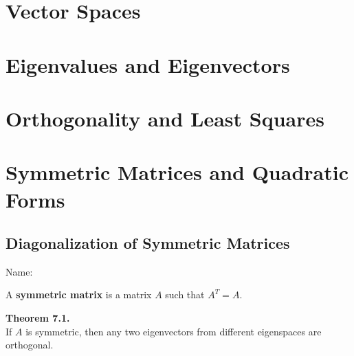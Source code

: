 \documentclass[10pt]{book}
\newcommand{\boxcolor}{gray!30}
\newenvironment{boxthm}{\begin{mdframed}[backgroundcolor=\boxcolor,nobreak=true]}{\end{mdframed}}
\newenvironment{boxdef}{\begin{mdframed}[backgroundcolor=\boxcolor,linewidth=0pt,nobreak=true]}{\end{mdframed}}
\theoremstyle{definition}
\newcommand{\name}[1][2.5in]{\vspace{-2.3em}\hfill Name: \underline{\hspace{#1}}}
\begin{document}


\chapter{Vector Spaces}
\setcounter{section}{0}




\chapter{Eigenvalues and Eigenvectors}
\setcounter{section}{0}



\chapter{Orthogonality and Least Squares}
\setcounter{section}{0}



\chapter{Symmetric Matrices and Quadratic Forms}
\setcounter{section}{0}

\section[Diag. of Sym. Matrices]{Diagonalization of Symmetric Matrices}
\name[1.5in]

\begin{boxdef}
	A \textbf{symmetric matrix} is a matrix $A$ such that $A^T=A$.
\end{boxdef}
\vspace{-1em}
\begin{boxthm}
	\textbf{Theorem 7.1.} \\
	If $A$ is symmetric, then any two eigenvectors from different eigenspaces are orthogonal.
\end{boxthm}
\end{document}

